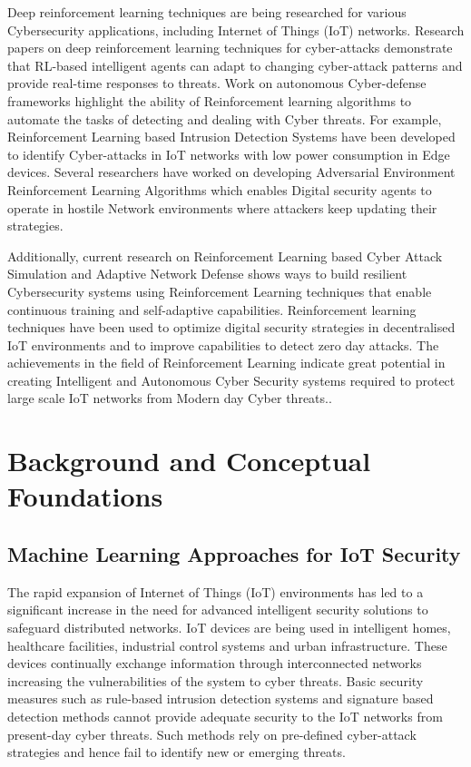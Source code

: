 \documentclass[12pt]{article}
\begin{document}
Deep reinforcement learning techniques are being researched for various Cybersecurity applications, including Internet of Things (IoT) networks. Research papers on deep reinforcement learning techniques for cyber-attacks demonstrate that RL-based intelligent agents can adapt to changing cyber-attack patterns and provide real-time responses to threats. Work on autonomous Cyber-defense frameworks highlight the ability of Reinforcement learning algorithms to automate the tasks of detecting and dealing with Cyber threats. For example, Reinforcement Learning based Intrusion Detection Systems have been developed to identify Cyber-attacks in IoT networks with low power consumption in Edge devices. Several researchers have worked on developing Adversarial Environment Reinforcement Learning Algorithms which enables Digital security agents to operate in hostile Network environments where attackers keep updating their strategies. 

Additionally, current research on Reinforcement Learning based Cyber Attack Simulation and Adaptive Network Defense shows ways to build resilient Cybersecurity systems using Reinforcement Learning techniques that enable continuous training and self-adaptive capabilities. Reinforcement learning techniques have been used to optimize digital security strategies in decentralised IoT environments and to improve capabilities to detect zero day attacks. The achievements in the field of Reinforcement Learning indicate great potential in creating Intelligent and Autonomous Cyber Security systems required to protect large scale IoT networks from Modern day Cyber threats.\cite{Patel2024, Gupta2024, Sharma2023}.

	

	\section{Background and Conceptual Foundations}
	\subsection{Machine Learning Approaches for IoT Security}
    The rapid expansion of Internet of Things (IoT) environments has led to a significant increase in the need for advanced intelligent security solutions to safeguard distributed networks. IoT devices are being used in intelligent homes, healthcare facilities, industrial control systems and urban infrastructure. These devices continually exchange information through interconnected networks increasing the vulnerabilities of the system to cyber threats. Basic security measures such as rule-based intrusion detection systems and signature based detection methods cannot provide adequate security to the IoT networks from present-day cyber threats. Such methods rely on pre-defined cyber-attack strategies and hence fail to identify new or emerging threats. 
\end{document}
